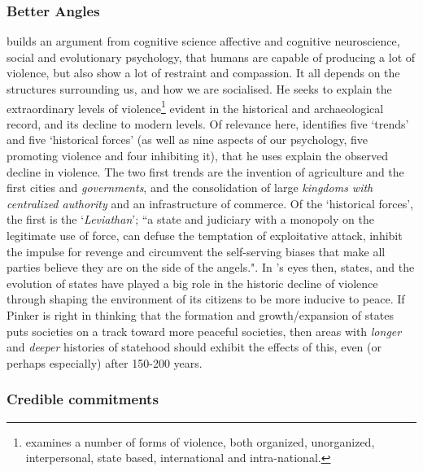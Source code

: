 \documentclass[12pt]{article}
\begin{document}
\subsubsection{Better Angles}

\citet{Pinker2012} builds an argument from cognitive science affective and
cognitive neuroscience, social and evolutionary  psychology, that humans are
capable of producing a lot of violence, but also show a lot of restraint and
compassion. It  all depends on the structures surrounding us, and how we are
socialised. He seeks to explain the extraordinary levels of
violence\footnote{\citet{Pinker2012} examines a number of forms of violence,
	both organized, unorganized, interpersonal, state based, international
and intra-national.} evident in the historical and archaeological record, and its
decline to modern levels.  Of relevance here, \citet{Pinker2012} identifies five
`trends' and five `historical forces' (as well as nine aspects of our
psychology, five promoting violence and four inhibiting it), that he uses
explain the observed decline in violence. The two first trends are the invention
of agriculture and the first cities and \textit{governments}, and the
consolidation of large \textit{kingdoms with centralized authority} and an
infrastructure of commerce. Of the `historical forces', the first is the
`\textit{Leviathan}'; ``a state and judiciary with a monopoly on the legitimate
use of force, can defuse the temptation of exploitative attack, inhibit the
impulse for revenge and circumvent the self-serving biases that make all parties
believe they are on the side of the angels.". In \citet{Pinker2012}'s eyes then,
states, and the evolution of states have played a big role in the historic
decline of violence through shaping the environment of its citizens to be more
inducive to peace. If Pinker is right in thinking that the formation and
growth/expansion of states puts societies on a track toward more peaceful
societies, then areas with \textit{longer} and \textit{deeper} histories of
statehood should exhibit the effects of this, even (or perhaps especially) after
150-200 years.


\subsubsection{Credible commitments}
\end{document}
